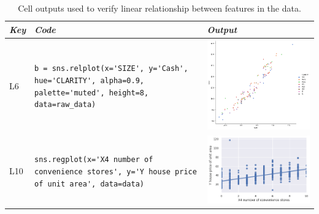 \begin{table}
  \centering
  \caption{Cell outputs used to verify linear relationship between features in the data.}
  \begin{tabular}{@{}m{} m{} m{}@{}}
    \toprule
    \emph{\textbf{Key}}&
    \emph{\textbf{Code}}&
    \emph{\textbf{Output}}\\
    \midrule

    L6&
    \lstinline[]$b = sns.relplot(x='SIZE', y='Cash', hue='CLARITY', alpha=0.9, palette='muted', height=8, data=raw_data)$&
    \includegraphics[width=\linewidth]{linear-relation-check-lineplot.png}\\

    L10&
    \lstinline[]$sns.regplot(x='X4 number of convenience stores', y='Y house price of unit area', data=data)$&
    \includegraphics[width=\linewidth]{linear-relation-check-regplot.png}\\
    \bottomrule
  \end{tabular}
\label{tab:linear-relation-check}
\end{table}

